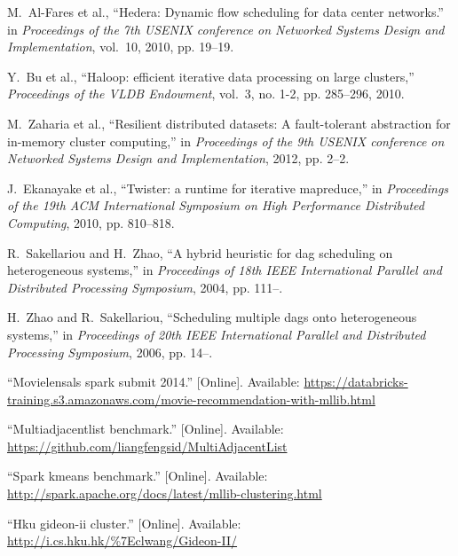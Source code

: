 \documentclass[10pt,journal,compsoc]{IEEEtran}
\begin{document}
\begin{thebibliography}{44}
M.~Al-Fares et al., ``Hedera:
  Dynamic flow scheduling for data center networks.'' in \emph{Proceedings of
  the 7th USENIX conference on Networked Systems Design and Implementation},
  vol.~10, 2010, pp. 19--19.

Y.~Bu et al., ``Haloop: efficient iterative
  data processing on large clusters,'' \emph{Proceedings of the VLDB
  Endowment}, vol.~3, no. 1-2, pp. 285--296, 2010.

M.~Zaharia et al., ``Resilient distributed datasets: A fault-tolerant
  abstraction for in-memory cluster computing,'' in \emph{Proceedings of the
  9th USENIX conference on Networked Systems Design and Implementation}, 2012,
  pp. 2--2.

J.~Ekanayake et al.,
  ``Twister: a runtime for iterative mapreduce,'' in \emph{Proceedings of the
  19th ACM International Symposium on High Performance Distributed Computing},
  2010, pp. 810--818.

R.~Sakellariou and H.~Zhao, ``A hybrid heuristic for dag scheduling on
  heterogeneous systems,'' in \emph{Proceedings of 18th IEEE International
  Parallel and Distributed Processing Symposium}, 2004, pp. 111--.

H.~Zhao and R.~Sakellariou, ``Scheduling multiple dags onto heterogeneous
  systems,'' in \emph{Proceedings of 20th IEEE International Parallel and
  Distributed Processing Symposium}, 2006, pp. 14--.

\BIBentryALTinterwordspacing
``Movielensals spark submit 2014.'' [Online]. Available:
  \url{https://databricks-training.s3.amazonaws.com/movie-recommendation-with-mllib.html}
\BIBentrySTDinterwordspacing

\BIBentryALTinterwordspacing
``Multiadjacentlist benchmark.'' [Online]. Available:
  \url{https://github.com/liangfengsid/MultiAdjacentList}
\BIBentrySTDinterwordspacing

\BIBentryALTinterwordspacing
``Spark kmeans benchmark.'' [Online]. Available:
  \url{http://spark.apache.org/docs/latest/mllib-clustering.html}
\BIBentrySTDinterwordspacing


\BIBentryALTinterwordspacing
``Hku gideon-ii cluster.'' [Online]. Available:
  \url{http://i.cs.hku.hk/\%7Eclwang/Gideon-II/}
\BIBentrySTDinterwordspacing




\end{thebibliography}
\end{document}
